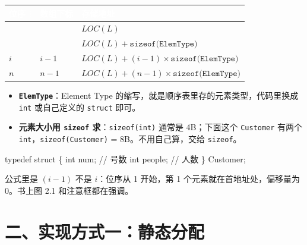 \documentclass[10.5pt,a4paper,oneside]{article}
\newcommand{\uln}[1]{\CJKunderline[format=\color{wdred},thickness=0.9pt,depth=0.28em]{#1}}
\providecommand{\tightlist}{\setlength{\itemsep}{2pt}\setlength{\parskip}{0pt}}
\newenvironment{Shaded}{}{}
\newcommand{\CommentTok}[1]{\textcolor[rgb]{0.18,0.55,0.23}{#1}}
\newcommand{\DataTypeTok}[1]{\textcolor[rgb]{0.12,0.31,0.71}{#1}}
\newcommand{\KeywordTok}[1]{\textcolor[rgb]{0.12,0.31,0.71}{#1}}
\newcommand{\NormalTok}[1]{#1}
\newcommand{\OperatorTok}[1]{\textcolor[rgb]{0.20,0.20,0.20}{#1}}
\begin{document}
{
\begin{xltabular}{\linewidth}{>{\hsize\raggedright\arraybackslash}X>{\hsize\raggedright\arraybackslash}X>{\hsize\raggedright\arraybackslash}X}
\textcolor{white}{\bfseries 位序 \(i\)} & \textcolor{white}{\bfseries 数组下标} & \textcolor{white}{\bfseries 存储地址} \\
 & 0 & \(LOC(L)\) \\  & 1 & \(LOC(L)+\texttt{sizeof(ElemType)}\) \\ \hline
\(i\) & \(i-1\) & \(LOC(L)+(i-1)\times\texttt{sizeof(ElemType)}\) \\ \hline
\(n\) & \(n-1\) & \(LOC(L)+(n-1)\times\texttt{sizeof(ElemType)}\) \\ \hline
\end{xltabular}\par\vspace{4pt}}

\begin{itemize}
\tightlist
\item
  \textbf{\texttt{ElemType}}：Element Type
  的缩写，就是顺序表里存的元素类型，代码里换成 \texttt{int} 或自己定义的
  \texttt{struct} 即可。
\item
  \textbf{元素大小用 \texttt{sizeof} 求}：\texttt{sizeof(int)} 通常是
  4B；下面这个 \texttt{Customer} 有两个
  \texttt{int}，\texttt{sizeof(Customer)} = 8B。不用自己算，交给
  \texttt{sizeof}。
\end{itemize}

\begin{Shaded}
\begin{Highlighting}[]
\KeywordTok{typedef} \KeywordTok{struct} \OperatorTok{\{}
    \DataTypeTok{int}\NormalTok{ num}\OperatorTok{;}      \CommentTok{// 号数}
    \DataTypeTok{int}\NormalTok{ people}\OperatorTok{;}   \CommentTok{// 人数}
\OperatorTok{\}}\NormalTok{ Customer}\OperatorTok{;}
\end{Highlighting}
\end{Shaded}

\begin{pitfallbox}

公式里是 \((i-1)\) 不是 \(i\)：位序从 1 开始，第 1
个元素就在首地址处，偏移量为 0。书上图 2.1
和注意框都在强调\uln{位序与下标之间的转换}。

\end{pitfallbox}

\hypertarget{ux4e8cux5b9eux73b0ux65b9ux5f0fux4e00ux9759ux6001ux5206ux914d}{%
\section{二、实现方式一：静态分配}\label{ux4e8cux5b9eux73b0ux65b9ux5f0fux4e00ux9759ux6001ux5206ux914d}}
\end{document}
